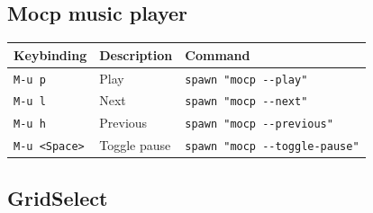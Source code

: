\hypertarget{mocp-music-player}{%
\subsection{Mocp music player}\label{mocp-music-player}}

\begin{longtable}[]{@{}lll@{}}
\toprule
Keybinding & Description & Command \\
\midrule
\endhead
\texttt{M-u\ p} & Play & \texttt{spawn\ "mocp\ -\/-play"} \\
\texttt{M-u\ l} & Next & \texttt{spawn\ "mocp\ -\/-next"} \\
\texttt{M-u\ h} & Previous & \texttt{spawn\ "mocp\ -\/-previous"} \\
\texttt{M-u\ \textless{}Space\textgreater{}} & Toggle pause &
\texttt{spawn\ "mocp\ -\/-toggle-pause"} \\
\bottomrule
\end{longtable}

\hypertarget{gridselect}{%
\subsection{GridSelect}\label{gridselect}}

